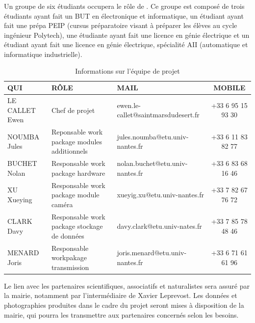 \newpage
Un groupe de six étudiants occupera le rôle de .
Ce groupe est composé de trois étudiants ayant fait un BUT en électronique et informatique, un étudiant ayant fait une prépa PEIP (cursus préparatoire visant à préparer les élèves au cycle ingénieur Polytech), une étudiante ayant fait une licence en génie électrique et un étudiant ayant fait une licence en génie électrique, spécialité AII (automatique et informatique industrielle). \\[15pt]

\begin{table}[h!]
   \centering
   \renewcommand{\arraystretch}{1.2} %
   \begin{tabular}{|m{2.5cm}|m{5cm}|m{5cm}|c|}
      \hline
      \textbf{QUI}   & \textbf{RÔLE}                                & \textbf{MAIL}                       & \textbf{MOBILE}   \\
      \hline
      LE CALLET Ewen & Chef de projet                               & ewen.le-callet@saintmarsdudesert.fr & +33 6 95 15 93 30 \\
      \hline
      NOUMBA Jules   & Reponsable work package modules additionnels & jules.noumba@etu.univ-nantes.fr     & +33 6 11 83 82 77 \\
      \hline
      BUCHET Nolan   & Responsable work package hardware            & nolan.buchet@etu.univ-nantes.fr     & +33 6 83 68 16 46 \\
      \hline
      XU Xueying     & Responsable work package module caméra       & xueyig.xu@etu.univ-nantes.fr        & +33 7 82 67 76 72 \\
      \hline
      CLARK Davy     & Responsable work package stockage de données & davy.clark@etu.univ-nates.fr        & +33 7 85 78 48 46 \\
      \hline
      MENARD Joris   & Responsable workpakage transmission          & joris.menard@etu.univ-nantes.fr     & +33 6 71 61 61 96 \\
      \hline
   \end{tabular}
   \caption{Informations sur l'équipe de projet}
   \label{tab:intervenants}
\end{table}

\vspace{1.5em}
Le lien avec les partenaires scientifiques, associatifs et naturalistes sera assuré par la mairie, notamment par l’intermédiaire de Xavier Leprevost. Les données et photographies produites dans le cadre du projet seront mises à disposition de la mairie, qui pourra les transmettre aux partenaires concernés selon les besoins.